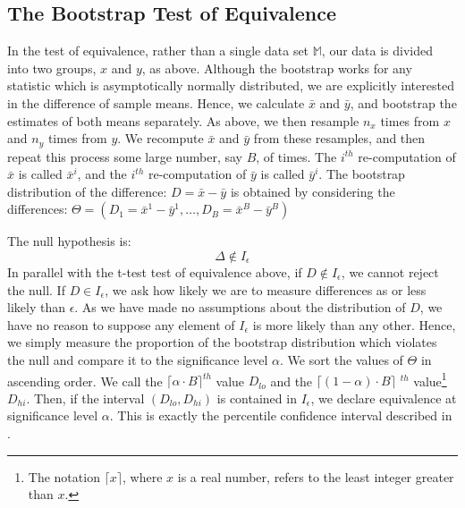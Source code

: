 \subsection{The Bootstrap Test of Equivalence}

In the test of equivalence, rather than a single data set $\mathbb{M}$, our data is divided into two groups, $x$ and $y$, as above. Although the bootstrap works for any statistic which is asymptotically normally distributed, we are explicitly interested in the difference of sample means. Hence, we calculate $\bar{x}$ and $\bar{y}$, and bootstrap the estimates of both means separately. As above, we then resample $n_x$ times from $x$ and  $n_y$ times from $y$. We recompute $\bar{x}$ and $\bar{y}$ from these resamples, and then repeat this process some large number, say $B$, of times. The $i^{th}$ re-computation of $\bar{x}$ is called $\bar{x}^i$, and the $i^{th}$ re-computation of $\bar{y}$ is called $\bar{y}^i$. The bootstrap distribution of the difference: $D =\bar{x} - \bar{y}$ is obtained by considering the differences: $\Theta = ( D_1 = \bar{x}^1 - \bar{y}^1, \dots, D_B = \bar{x}^B - \bar{y}^B )$

The null hypothesis is:
\[ \Delta \notin I_\epsilon \]
In parallel with the t-test test of equivalence above, if $D \notin I_\epsilon$, we cannot reject the null. If $D \in  I_\epsilon$, we ask how likely we are to measure differences as or less likely than $\epsilon$. As we have made no assumptions about the distribution of $D$, we have no reason to suppose any element of $I_\epsilon$ is more likely than any other.  Hence, we simply measure the proportion of the bootstrap distribution which violates the null and compare it to the significance level $\alpha$.  We sort the values of $\Theta$ in ascending order. We call the $\lceil \alpha \cdot B \rceil^{th}$ value $D_{lo}$ and the $ \lceil (1 -  \alpha)\cdot B \rceil$ $^{th}$ value\footnote{The notation $\lceil x \rceil$, where $x$ is a real number, refers to the least integer greater than $x$. } $D_{hi}$. Then, if the interval $(D_{lo}, D_{hi})$ is contained in $I_\epsilon$, we declare equivalence at significance level $\alpha$.  This is exactly the percentile confidence interval described in \cite{BootstrapBook} . 
 


